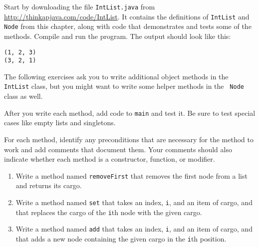\begin{exercise}
\label{ex.list}

Start by downloading the file {\tt IntList.java} from
\url{http://thinkapjava.com/code/IntList}.  It contains
the definitions of {\tt IntList} and {\tt Node} from this chapter,
along with code that demonstrates and tests some of the methods.
Compile and run the program.  The output should look like this:

\begin{verbatim}
(1, 2, 3)
(3, 2, 1)
\end{verbatim}

The following exercises ask you to write additional object
methods in the {\tt IntList}
class, but you might want to write some helper methods in the {\tt
Node} class as well.

After you write each method, add code to {\tt main}
and test it.  Be sure to test special cases like empty lists and
singletons.

For each method, identify any preconditions that are necessary
for the method to work and add comments that document them.  Your
comments should also indicate whether each method is a constructor,
function, or modifier.

\begin{enumerate}

\item Write a method named {\tt removeFirst} that removes
the first node from a list and returns its cargo.

\item Write a method named {\tt set} that takes an index, {\tt i}, and
an item of cargo, and that replaces the cargo of the {\tt i}th node
with the given cargo.

\item Write a method named {\tt add} that takes an index, {\tt i}, and
an item of cargo, and that adds a new node containing the given cargo
in the {\tt i}th position.




\end{enumerate}
\end{exercise}
